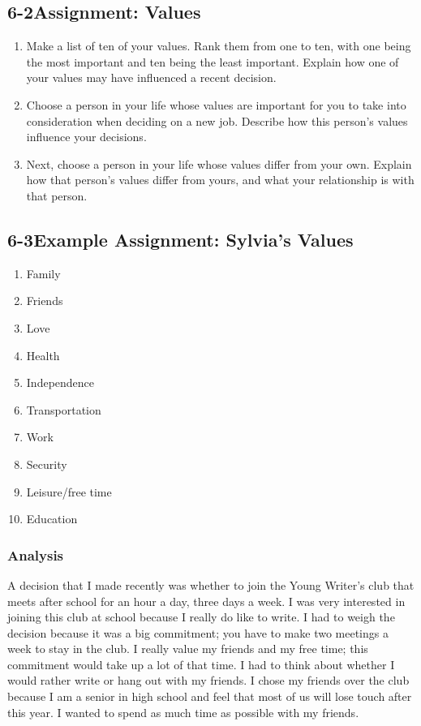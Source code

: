 \pagebreak \subsection*{6-2\quad Assignment: Values}
\begin{enumerate}[leftmargin=1cm]
	\item Make a list of ten of your values. Rank them from one to ten, with one being the most important and ten being the least important.
	      Explain how one of your values may have influenced a recent decision.
	\item Choose a person in your life whose values are important for you to take into consideration when deciding on a new job. Describe how this person's values influence your decisions.
	\item Next, choose a person in your life whose values differ from your own. Explain how that person's values differ from yours, and what your relationship is with that person.
\end{enumerate}
\pagebreak \subsection*{6-3\quad Example Assignment: Sylvia's Values}

\begin{multicols}{2}
	\begin{enumerate}[leftmargin=1cm]
		\item Family
		\item Friends
		\item Love
		\item Health
		\item Independence
		\item Transportation
		\item Work
		\item Security
		\item Leisure/free time
		\item Education
	\end{enumerate} \end{multicols}
\subsubsection*{Analysis}
A decision that I made recently was whether to join the Young Writer's club that meets after school for an hour a day, three days a week. I was very interested in joining this club at school because I really do like to write. I had to weigh the decision because it was a big commitment; you have to make two meetings a week to stay in the club. I really value my friends and my free time; this commitment would take up a lot of that time. I had to think about whether I would rather write or hang out with my friends. I chose my friends over the club because I am a senior in high school and feel that most of us will lose touch after this year. I wanted to spend as much time as possible with my friends.

